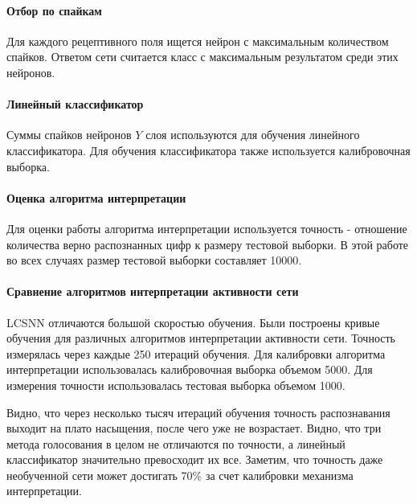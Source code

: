 \documentclass[a4paper]{article}
\begin{document}
\paragraph{Отбор по спайкам}
Для каждого рецептивного поля ищется нейрон с максимальным количеством спайков. Ответом сети считается класс с максимальным результатом среди этих нейронов.

\paragraph{Линейный классификатор}
Суммы спайков нейронов $Y$ слоя используются для обучения линейного классификатора. Для обучения классификатора также используется калибровочная выборка.

\paragraph{Оценка алгоритма интерпретации}
Для оценки работы алгоритма интерпретации используется точность - отношение количества верно распознанных цифр к размеру тестовой выборки. В этой работе во всех случаях размер тестовой выборки составляет 10000. 

\paragraph{Сравнение алгоритмов интерпретации активности сети}
LCSNN отличаются большой скоростью обучения. Были построены кривые обучения для различных алгоритмов интерпретации активности сети. Точность измерялась через каждые 250 итераций обучения. Для калибровки алгоритма интерпретации использовалась калибровочная выборка объемом 5000. Для измерения точности использовалась тестовая выборка объемом 1000.

Видно, что через несколько тысяч итераций обучения точность распознавания выходит на плато насыщения, после чего уже не возрастает. Видно, что три метода голосования в целом не отличаются по точности, а линейный классификатор значительно превосходит их все. Заметим, что точность даже необученной сети может достигать 70\% за счет калибровки механизма интерпретации.
\end{document}
